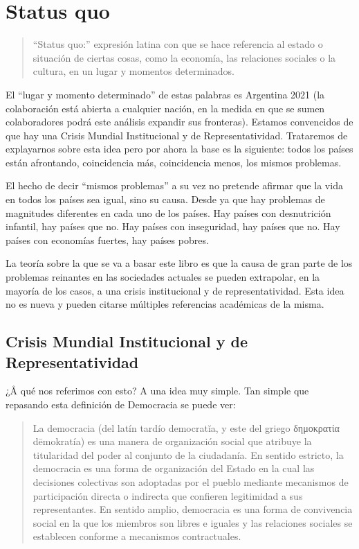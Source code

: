 \documentclass[
]{book}
\begin{document}
\hypertarget{status-quo}{%
\section{Status quo}\label{status-quo}}

\begin{quote}
``Status quo:'' expresión latina con que se hace referencia al estado o situación de ciertas cosas, como la economía, las relaciones sociales o la cultura, en un lugar y momentos determinados.
\end{quote}

El ``lugar y momento determinado'' de estas palabras es Argentina 2021 (la colaboración está abierta a cualquier nación, en la medida en que se sumen colaboradores podrá este análisis expandir sus fronteras). Estamos convencidos de que hay una Crisis Mundial Institucional y de Representatividad. Trataremos de explayarnos sobre esta idea pero por ahora la base es la siguiente: todos los países están afrontando, coincidencia más, coincidencia menos, los mismos problemas.

El hecho de decir ``mismos problemas'' a su vez no pretende afirmar que la vida en todos los países sea igual, sino su causa. Desde ya que hay problemas de magnitudes diferentes en cada uno de los países. Hay países con desnutrición infantil, hay países que no. Hay países con inseguridad, hay países que no. Hay países con economías fuertes, hay países pobres.

La teoría sobre la que se va a basar este libro es que la causa de gran parte de los problemas reinantes en las sociedades actuales se pueden extrapolar, en la mayoría de los casos, a una crisis institucional y de representatividad. Esta idea no es nueva y pueden citarse múltiples referencias académicas de la misma.

\hypertarget{crisis-mundial-institucional-y-de-representatividad}{%
\subsection{Crisis Mundial Institucional y de Representatividad}\label{crisis-mundial-institucional-y-de-representatividad}}

¿Å qué nos referimos con esto? A una idea muy simple. Tan simple que repasando esta definición de Democracia se puede ver:

\begin{quote}
La democracia (del latín tardío democratĭa, y este del griego δημοκρατία dēmokratía) es una manera de organización social que atribuye la titularidad del poder al conjunto de la ciudadanía. En sentido estricto, la democracia es una forma de organización del Estado en la cual las decisiones colectivas son adoptadas por el pueblo mediante mecanismos de participación directa o indirecta que confieren legitimidad a sus representantes. En sentido amplio, democracia es una forma de convivencia social en la que los miembros son libres e iguales y las relaciones sociales se establecen conforme a mecanismos contractuales.
\end{quote}
\end{document}
